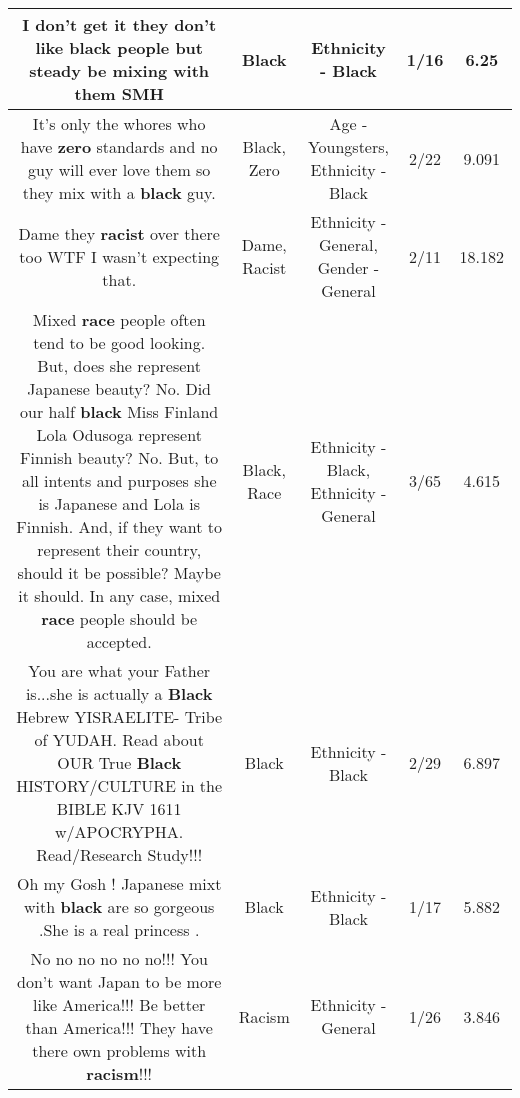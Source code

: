 \documentclass[11pt]{article}
\newlength\mylength
\begin{document}
\begin{center}
\begin{longtable}{|C{.65\mylength}|C{.30\mylength}|C{.12\mylength}|C{.12\mylength}|C{.12\mylength}|}
  \small I don't get it they don't like \textbf{black} people but steady be mixing with them SMH\normalsize   & Black & Ethnicity - Black & 1/16 & 6.25 \\  \hline
  \small It's only the whores who have \textbf{zero} standards and no guy will ever love them so they mix with a \textbf{black} guy.\normalsize   & Black, Zero & Age - Youngsters, Ethnicity - Black & 2/22 & 9.091 \\  \hline
  \small Dame they \textbf{racist} over there too WTF I wasn't expecting that.\normalsize   & Dame, Racist & Ethnicity - General, Gender - General & 2/11 & 18.182 \\  \hline
  \small Mixed \textbf{race} people often tend to be good looking. But, does she represent Japanese beauty? No. Did our half \textbf{black} Miss Finland Lola Odusoga represent Finnish beauty? No. But, to all intents and purposes she is Japanese and Lola is Finnish. And, if they want to represent their country, should it be possible? Maybe it should. In any case, mixed \textbf{race} people should be accepted.\normalsize   & Black, Race & Ethnicity - Black, Ethnicity - General & 3/65 & 4.615 \\  \hline
  \small You are what your  Father is...she is actually a \textbf{Black} Hebrew YISRAELITE- Tribe of YUDAH. Read about OUR True \textbf{Black} HISTORY/CULTURE in the BIBLE KJV 1611 w/APOCRYPHA. Read/Research Study!!!\normalsize   & Black & Ethnicity - Black & 2/29 & 6.897 \\  \hline
  \small Oh my Gosh ! Japanese mixt with \textbf{black} are so gorgeous .She is a real princess .\normalsize   & Black & Ethnicity - Black & 1/17 & 5.882 \\  \hline
  \small No no no no no no!!! You don't want Japan to be more like America!!! Be better than America!!! They have there own problems with \textbf{racism}!!!\normalsize   & Racism & Ethnicity - General & 1/26 & 3.846 \\  \hline

\end{longtable}
\end{center}
\end{document}
